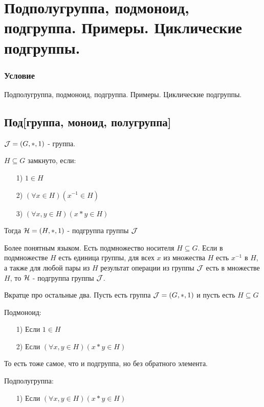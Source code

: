 \documentclass{report}
\begin{document}
\newpage

\section{Подполугруппа, подмоноид, подгруппа. Примеры. Циклические подгруппы.}
\subsubsection{Условие}
Подполугруппа, подмоноид, подгруппа. Примеры. Циклические подгруппы.

\subsection{Под[группа, моноид, полугруппа]}
${\cal J} = (G, *, 1)$ - группа.

\medskip

$H \subseteq G$ замкнуто, если:
\begin{itemize}
	\item[1)] $1 \in H$
	\item[2)] $(\forall x \in H)(x^{-1} \in H)$
	\item[3)] $(\forall x,y \in H)(x * y \in H)$
\end{itemize}

Тогда ${\cal H} = (H, *, 1)$ - подгруппа группы $\cal J$


Более понятным языком. Есть подмножество носителя $H \subseteq G$. Если в подмножестве
$H$ есть единица группы, для всех $x$ из множества $H$ есть $x^{-1}$ в $H$, а также
для любой пары из $H$ результат операции из группы $\cal J$ есть в множестве $H$, то
${\cal H}$ - подгруппа группы $\cal J$.

\medskip

Вкратце про остальные два. Пусть есть группа ${\cal J} = (G, *, 1)$ и пусть есть $H \subseteq G$

Подмоноид:
\begin{itemize}
	\item[1)] Если $1 \in H$
	\item[2)] Если $(\forall x,y \in H)(x * y \in H)$
\end{itemize}

То есть тоже самое, что и подгруппа, но без обратного элемента.

\medskip

Подполугруппа:
\begin{itemize}
	\item[1)] Если $(\forall x,y \in H)(x * y \in H)$
\end{itemize}
\end{document}
